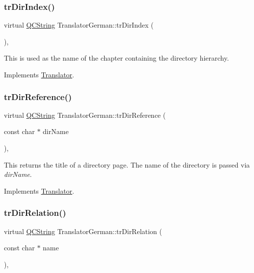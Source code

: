 \subsubsection{\texorpdfstring{trDirIndex()}{trDirIndex()}}
{\footnotesize\ttfamily virtual \mbox{\hyperlink{class_q_c_string}{Q\+C\+String}} Translator\+German\+::tr\+Dir\+Index (\begin{DoxyParamCaption}{ }\end{DoxyParamCaption})\hspace{0.3cm}{\ttfamily [inline]}, {\ttfamily [virtual]}}

This is used as the name of the chapter containing the directory hierarchy. 

Implements \mbox{\hyperlink{class_translator}{Translator}}.

\mbox{\label{class_translator_german_af052928213c7388e1f63f40d536507c0}} 
\subsubsection{\texorpdfstring{trDirReference()}{trDirReference()}}
{\footnotesize\ttfamily virtual \mbox{\hyperlink{class_q_c_string}{Q\+C\+String}} Translator\+German\+::tr\+Dir\+Reference (\begin{DoxyParamCaption}\item[{const char $\ast$}]{dir\+Name }\end{DoxyParamCaption})\hspace{0.3cm}{\ttfamily [inline]}, {\ttfamily [virtual]}}

This returns the title of a directory page. The name of the directory is passed via {\itshape dir\+Name}. 

Implements \mbox{\hyperlink{class_translator}{Translator}}.

\mbox{\label{class_translator_german_ae75c84f71a7b82d8d58702864d01eb41}} 
\subsubsection{\texorpdfstring{trDirRelation()}{trDirRelation()}}
{\footnotesize\ttfamily virtual \mbox{\hyperlink{class_q_c_string}{Q\+C\+String}} Translator\+German\+::tr\+Dir\+Relation (\begin{DoxyParamCaption}\item[{const char $\ast$}]{name }\end{DoxyParamCaption})\hspace{0.3cm}{\ttfamily [inline]}, {\ttfamily [virtual]}}

